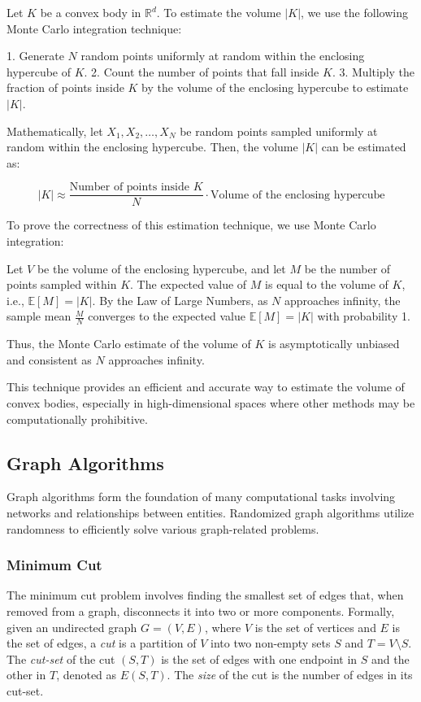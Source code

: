 \documentclass[12pt]{book} %
\begin{document}
Let \(K\) be a convex body in \(\mathbb{R}^d\). To estimate the volume \(|K|\), we use the following Monte Carlo integration technique:

1. Generate \(N\) random points uniformly at random within the enclosing hypercube of \(K\).
2. Count the number of points that fall inside \(K\).
3. Multiply the fraction of points inside \(K\) by the volume of the enclosing hypercube to estimate \(|K|\).

Mathematically, let \(X_1, X_2, \ldots, X_N\) be random points sampled uniformly at random within the enclosing hypercube. Then, the volume \(|K|\) can be estimated as:

\[
|K| \approx \frac{\text{Number of points inside } K}{N} \cdot \text{Volume of the enclosing hypercube}
\]

To prove the correctness of this estimation technique, we use Monte Carlo integration:

Let \(V\) be the volume of the enclosing hypercube, and let \(M\) be the number of points sampled within \(K\). The expected value of \(M\) is equal to the volume of \(K\), i.e., \(\mathbb{E}[M] = |K|\). By the Law of Large Numbers, as \(N\) approaches infinity, the sample mean \(\frac{M}{N}\) converges to the expected value \(\mathbb{E}[M] = |K|\) with probability 1.

Thus, the Monte Carlo estimate of the volume of \(K\) is asymptotically unbiased and consistent as \(N\) approaches infinity.

This technique provides an efficient and accurate way to estimate the volume of convex bodies, especially in high-dimensional spaces where other methods may be computationally prohibitive.


\subsection{Graph Algorithms}
Graph algorithms form the foundation of many computational tasks involving networks and relationships between entities. Randomized graph algorithms utilize randomness to efficiently solve various graph-related problems.

\subsubsection{Minimum Cut}
The minimum cut problem involves finding the smallest set of edges that, when removed from a graph, disconnects it into two or more components. Formally, given an undirected graph \(G = (V, E)\), where \(V\) is the set of vertices and \(E\) is the set of edges, a \textit{cut} is a partition of \(V\) into two non-empty sets \(S\) and \(T = V \setminus S\). The \textit{cut-set} of the cut \((S, T)\) is the set of edges with one endpoint in \(S\) and the other in \(T\), denoted as \(E(S, T)\). The \textit{size} of the cut is the number of edges in its cut-set.
\end{document}
